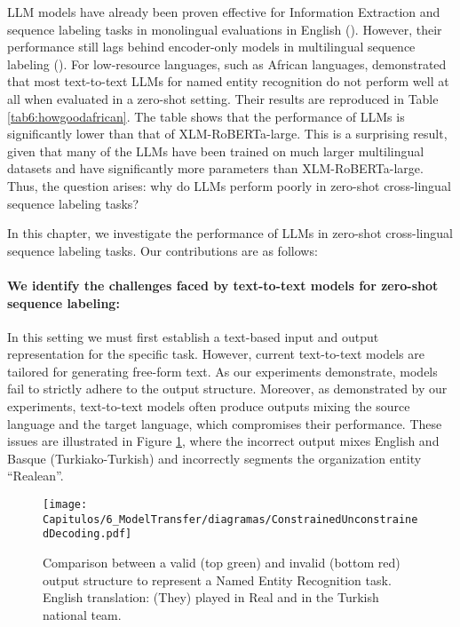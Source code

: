 

LLM models have already been proven effective for Information Extraction and sequence labeling tasks in monolingual evaluations in English (\cite{DBLP:journals/corr/abs-2305-15444, sainz2024gollie}). However, their performance still lags behind encoder-only models in multilingual sequence labeling (\cite{DBLP:conf/semeval/FetahuKCRM23}). For low-resource languages, such as African languages, \cite{DBLP:conf/africanlp/OjoO23} demonstrated that most text-to-text LLMs for named entity recognition do not perform well at all when evaluated in a zero-shot setting. Their results are reproduced in Table \ref{tab6:howgoodafrican}. The table shows that the performance of LLMs is significantly lower than that of XLM-RoBERTa-large. This is a surprising result, given that many of the LLMs have been trained on much larger multilingual datasets and have significantly more parameters than XLM-RoBERTa-large. Thus, the question arises: why do LLMs perform poorly in zero-shot cross-lingual sequence labeling tasks?




In this chapter, we investigate the performance of LLMs in zero-shot cross-lingual sequence labeling tasks. Our contributions are as follows:

\paragraph{We identify the challenges faced by text-to-text models for zero-shot sequence labeling:} In this setting we must first establish a text-based input and output representation for the specific task. However, current text-to-text models are tailored for generating free-form text. As our experiments demonstrate, models fail to strictly adhere to the output structure. Moreover, as demonstrated by our experiments, text-to-text models often produce outputs mixing the source language and the target language, which compromises their performance. These issues are illustrated in Figure \ref{fig6:constrained_unconstrained}, where the incorrect output mixes English and Basque (Turkiako-Turkish) and incorrectly segments the organization entity ``Realean''.

\begin{figure}[htb]
    \centering
    \texttt{[image: Capitulos/6\_ModelTransfer/diagramas/ConstrainedUnconstrainedDecoding.pdf]}
    \caption{Comparison between a valid (top green) and invalid (bottom red) output structure to represent a Named Entity Recognition task. English translation: (They) played in Real and in the Turkish national team.}
    \label{fig6:constrained_unconstrained}
\end{figure}

